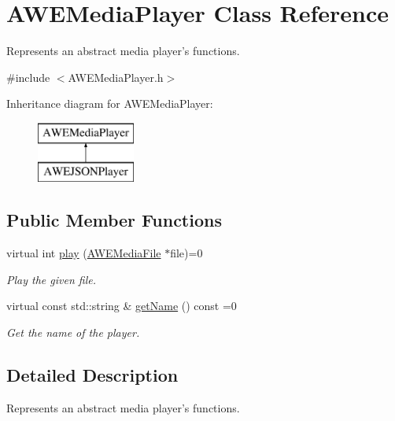 \hypertarget{class_a_w_e_media_player}{\section{A\-W\-E\-Media\-Player Class Reference}
\label{class_a_w_e_media_player}
}


Represents an abstract media player's functions.  




{\ttfamily \#include $<$A\-W\-E\-Media\-Player.\-h$>$}

Inheritance diagram for A\-W\-E\-Media\-Player\-:\begin{figure}[H]
\begin{center}
\leavevmode
\includegraphics[height=2.000000cm]{class_a_w_e_media_player}
\end{center}
\end{figure}
\subsection*{Public Member Functions}
\begin{DoxyCompactItemize}
\item 
virtual int \hyperlink{class_a_w_e_media_player_a091af21d061b72e4a8c4f8f06dfd7b30}{play} (\hyperlink{class_a_w_e_media_file}{A\-W\-E\-Media\-File} $\ast$file)=0
\begin{DoxyCompactList}\small\item\em Play the given file. \end{DoxyCompactList}\item 
virtual const std\-::string \& \hyperlink{class_a_w_e_media_player_a7916d0979c605e4633cc6f11ef59cebb}{get\-Name} () const =0
\begin{DoxyCompactList}\small\item\em Get the name of the player. \end{DoxyCompactList}\end{DoxyCompactItemize}


\subsection{Detailed Description}
Represents an abstract media player's functions. 

